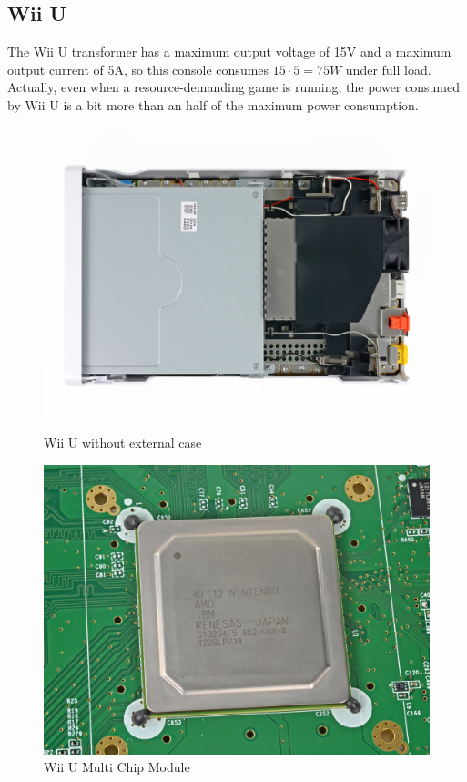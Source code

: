 \documentclass[11pt,a4paper,titlepage]{article}
\begin{document}
	\subsection{Wii U}
		The Wii U transformer has a maximum output voltage of 15V and a maximum output current of 5A, so this console consumes $15\cdot 5 = 75W$ under full load. Actually, even when a resource-demanding game is running, the power consumed by Wii U is a bit more than an half of the maximum power consumption.
		\begin{figure}[htbp]
			\centering
			\begin{minipage}{0.45\textwidth}
				\centering
				\includegraphics[width=\textwidth]{external_view.jpeg}
				\caption{Wii U without external case}
				\label{fig:external}
			\end{minipage}
			\hspace{0.5cm}
			\begin{minipage}{0.45\textwidth}
				\centering
				\includegraphics[width=\textwidth]{CPU_&_GPU.png}
				\caption{Wii U Multi Chip Module}
				\label{fig:mcm}
			\end{minipage}
		\end{figure}
\end{document}
